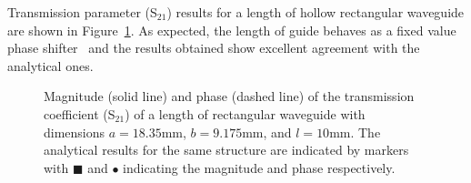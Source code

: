 Transmission parameter (S$_{21}$) results for a length of hollow
rectangular waveguide are shown in
Figure~\ref{lezar:fig:hollow_h_plane_S_parameters}. As expected, the length
of guide behaves as a fixed value phase shifter~\cite{PelCoc1998} and
the results obtained show excellent agreement with the analytical
ones.
\begin{figure}
 \centering
 \caption{Magnitude (solid line) and phase (dashed line) of the transmission coefficient (S$_{21}$) of a length of rectangular waveguide with dimensions $a=18.35\text{mm}$, $b=9.175\text{mm}$, and $l = 10\text{mm}$. The analytical results for the same structure are indicated by markers with $\blacksquare$ and $\bullet$ indicating the magnitude and phase respectively.}
 \label{lezar:fig:hollow_h_plane_S_parameters}
\end{figure}


